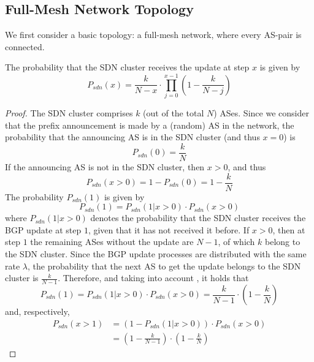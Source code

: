 \subsection{Full-Mesh Network Topology}
We first consider a basic topology: a full-mesh network, where every AS-pair is connected.

\begin{theorem}\label{thm:P-sdn}
The probability that the SDN cluster receives the update at step $x$ is given by
\begin{equation}\label{eq:P-sdn}
P_{sdn}(x) = \frac{k}{N-x}\cdot \prod_{j=0}^{x-1}\left(1-\frac{k}{N-j}\right)
\end{equation}
\end{theorem}
\begin{proof}
The SDN cluster comprises $k$ (out of the total $N$) ASes. Since we consider that the prefix announcement is made by a (random) AS in the network, the probability that the announcing AS is in the SDN cluster (and thus $x=0$) is 
\begin{equation}
P_{sdn}(0) = \frac{k}{N}
\end{equation}
If the announcing AS is not in the SDN cluster, then $x>0$, and thus
\begin{equation}\label{eq:Psdn-x-larger-0}
P_{sdn}(x>0) = 1-P_{sdn}(0) = 1-\frac{k}{N}
\end{equation}
The probability $P_{sdn}(1)$ is given by
\begin{equation}
P_{sdn}(1) = P_{sdn}(1|x>0)\cdot P_{sdn}(x>0)
\end{equation}
where $P_{sdn}(1|x>0)$ denotes the probability that the SDN cluster receives the BGP update at step $1$, given that it has not received it before. If $x>0$, then at step $1$ the remaining ASes  without the update are $N-1$, of which $k$ belong to the SDN cluster. Since the BGP update processes are distributed with the same rate $\lambda$, the probability that the next AS to get the update belongs to the SDN cluster is $\frac{k}{N-1}$. Therefore, and taking into account , it holds that 
\begin{equation}
P_{sdn}(1) = P_{sdn}(1|x>0)\cdot P_{sdn}(x>0) = \frac{k}{N-1}\cdot \left(1-\frac{k}{N}\right)
\end{equation}
and, respectively,
\begin{align}
P_{sdn}(x>1) &= \left(1-P_{sdn}(1|x>0)\right)\cdot P_{sdn}(x>0) \nonumber\\
			&= \left(1-\frac{k}{N-1}\right)\cdot \left(1-\frac{k}{N}\right)
\end{align}


\end{proof}
